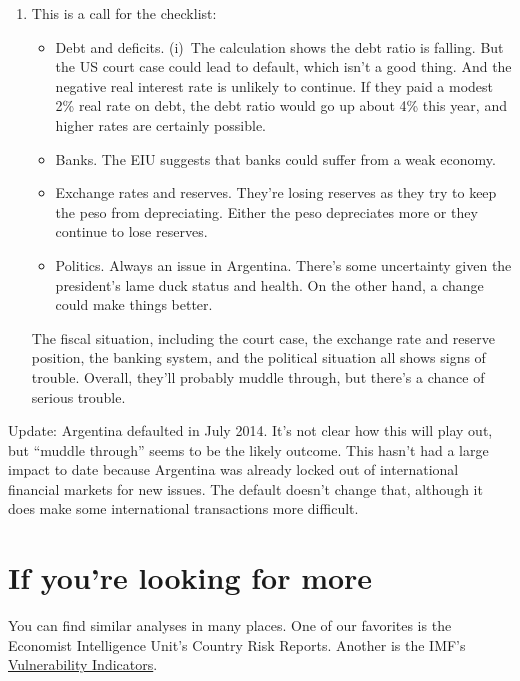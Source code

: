\begin{enumerate}
\begin{enumerate}
\item This is a call for the checklist:
\begin{itemize}
\item Debt and deficits.
(i)~The calculation shows the debt ratio is falling.
But the US court case could lead to default,
which isn't a good thing.
And the negative real interest rate is unlikely to continue.
If they paid a modest 2\% real rate on debt, the debt ratio would
go up about 4\% this year, 
and higher rates are certainly possible.

\item Banks.
The EIU suggests that banks could suffer from a weak economy.

\item Exchange rates and reserves.
They're losing reserves as they try to keep the peso
from depreciating.
Either the peso depreciates more or they continue to lose reserves.

\item Politics.  Always an issue in Argentina.
There's some uncertainty given the president's lame duck status and health.
On the other hand, a change could make things better.
\end{itemize}
%
The fiscal situation, including the court case, the exchange rate and reserve position,
the banking system, and the political situation all shows signs of trouble.
Overall, they'll probably muddle through,
but there's a chance of serious trouble.
\end{enumerate}
Update:  Argentina defaulted in July 2014.
It's not clear how this will play out, but ``muddle through'' seems to be the likely outcome.  
This hasn't had a large impact to date because Argentina
was already locked out of international financial markets for new issues.
The default doesn't change that, although it does make some international 
transactions more difficult.    



\end{enumerate}
\setlength{\leftmargini}{\oldleftmargini}


\section*{If you're looking for more}

You can find similar analyses in many places.
One of our favorites is the
Economist Intelligence Unit's Country Risk Reports.
Another is the IMF's
\href{http://www.imf.org/external/np/exr/facts/vul.htm}
{Vulnerability Indicators}.

